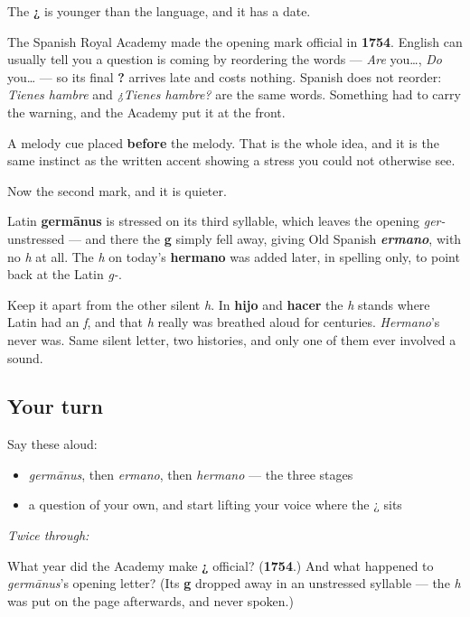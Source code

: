 \begin{grammarlens}[title={What you've built}]
The \textbf{¿} is younger than the language, and it has a date.

The Spanish Royal Academy made the opening mark official in \textbf{1754}. English can usually tell you a question is coming by reordering the words — \emph{Are} you…, \emph{Do} you… — so its final \textbf{?} arrives late and costs nothing. Spanish does not reorder: \emph{Tienes hambre} and \emph{¿Tienes hambre?} are the same words. Something had to carry the warning, and the Academy put it at the front.

A melody cue placed \textbf{before} the melody. That is the whole idea, and it is the same instinct as the written accent showing a stress you could not otherwise see.
\end{grammarlens}

\begin{culture}
Now the second mark, and it is quieter.

Latin \textbf{germānus} is stressed on its third syllable, which leaves the opening \emph{ger-} unstressed — and there the \textbf{g} simply fell away, giving Old Spanish \emph{\textbf{ermano}}, with no \emph{h} at all. The \emph{h} on today's \textbf{hermano} was added later, in spelling only, to point back at the Latin \emph{g-}.

Keep it apart from the other silent \emph{h}. In \textbf{hijo} and \textbf{hacer} the \emph{h} stands where Latin had an \emph{f}, and that \emph{h} really was breathed aloud for centuries. \emph{Hermano}'s never was. Same silent letter, two histories, and only one of them ever involved a sound.
\end{culture}

\subsection*{Your turn}
Say these aloud:

\begin{itemize}
\raggedright
  \item \emph{germānus}, then \emph{ermano}, then \emph{hermano} — the three stages
  \item a question of your own, and start lifting your voice where the ¿ sits
\end{itemize}

\emph{Twice through:}

\begin{tcolorbox}[breakable,colback=teal!4,colframe=teal!35!black,title={Before you move on}]
What year did the Academy make \textbf{¿} official? (\textbf{1754}.) And what happened to \emph{germānus}'s opening letter? (Its \textbf{g} dropped away in an unstressed syllable — the \emph{h} was put on the page afterwards, and never spoken.)
\end{tcolorbox}
